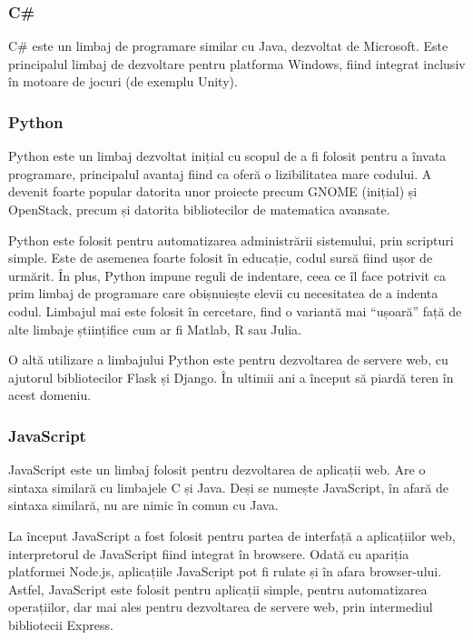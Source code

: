 \subsubsection{C\#}
\label{sec:appdev-langs-hybrid-ex-cs}

C\# este un limbaj de programare similar cu Java, dezvoltat de Microsoft. Este
principalul limbaj de dezvoltare pentru platforma Windows, fiind integrat
inclusiv în motoare de jocuri (de exemplu Unity).

\subsubsection{Python}
\label{sec:appdev-langs-hybrid-ex-python}

Python este un limbaj dezvoltat inițial cu scopul de a fi folosit pentru a
învata programare, principalul avantaj fiind ca oferă o lizibilitatea mare
codului. A devenit foarte popular datorita unor proiecte precum GNOME (inițial)
și OpenStack, precum și datorita bibliotecilor de matematica avansate.

Python este folosit pentru automatizarea administrării sistemului, prin
scripturi simple. Este de asemenea foarte folosit în educație, codul sursă fiind
ușor de urmărit. În plus, Python impune reguli de indentare, ceea ce îl face
potrivit ca prim limbaj de programare care obișnuiește elevii cu necesitatea de
a indenta codul. Limbajul mai este folosit în cercetare, find o variantă mai
“ușoară” față de alte limbaje științifice cum ar fi Matlab, R sau Julia.

O altă utilizare a limbajului Python este pentru dezvoltarea de servere web, cu
ajutorul bibliotecilor Flask și Django. În ultimii ani a început să piardă teren
în acest domeniu.

\subsubsection{JavaScript}
\label{sec:appdev-langs-hybrid-ex-js}

JavaScript este un limbaj folosit pentru dezvoltarea de aplicații web. Are o
sintaxa similară cu limbajele C și Java. Deși se numește JavaScript, în afară de
sintaxa similară, nu are nimic în comun cu Java.

La început JavaScript a fost folosit pentru partea de interfață a aplicațiilor
web, interpretorul de JavaScript fiind integrat în browsere. Odată cu apariția
platformei Node.js, aplicațiile JavaScript pot fi rulate și în afara
browser-ului. Astfel, JavaScript este folosit pentru aplicații simple, pentru
automatizarea operațiilor, dar mai ales pentru dezvoltarea de servere web, prin
intermediul bibliotecii Express.

